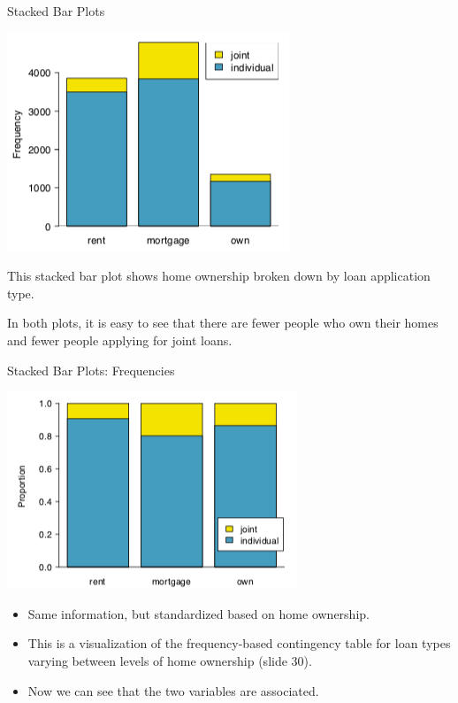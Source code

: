 \begin{frame}{Stacked Bar Plots}
    \begin{center}
        \includegraphics[scale=0.45]{images/stackedbar.png}
    \end{center}
    This stacked bar plot shows home ownership broken down by loan application type. 
    
    \vspace{12pt}In both plots, it is easy to see that there are fewer people who own their homes and fewer people applying for joint loans. 
\end{frame}

\begin{frame}{Stacked Bar Plots: Frequencies}
    \begin{center}
        \includegraphics[scale=0.45]{images/stackedbarstd.png}
    \end{center}
    \begin{itemize}
        \item Same information, but standardized based on home ownership.
        \item This is a visualization of the frequency-based contingency table for loan types varying between levels of home ownership (slide 30). 
        \item Now we can see that the two variables are associated.
    \end{itemize}
\end{frame}

